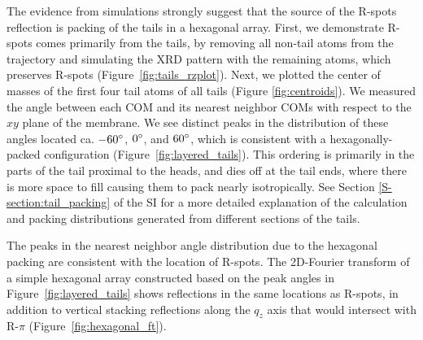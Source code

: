 \documentclass[journal=jpcbfk,manuscript=article]{achemso}
\begin{document}
  The evidence from simulations strongly suggest that the source of the R-spots
  reflection is packing of the tails in a hexagonal array.  First, we demonstrate
  R-spots comes primarily from the tails, by removing all non-tail atoms from the
  trajectory and simulating the XRD pattern with the remaining atoms, which
  preserves R-spots (Figure~\ref{fig:tails_rzplot}).  Next, we plotted the center
  of masses of the first four tail atoms of all tails (Figure
  \ref{fig:centroids}). We measured the angle between each COM and its nearest
  neighbor COMs with respect to the $xy$ plane of the membrane. We see distinct
  peaks in the distribution of these angles located ca. $-60\degree$, $0\degree$,
  and $60\degree$, which is consistent with a hexagonally-packed configuration
  (Figure~\ref{fig:layered_tails}).  This ordering is primarily in the parts of
  the tail proximal to the heads, and dies off at the tail ends, where there is
  more space to fill causing them to pack nearly isotropically. See Section
  \ref{S-section:tail_packing} of the SI for a more detailed explanation of the
  calculation and packing distributions generated from different sections of the
  tails.

  The peaks in the nearest neighbor angle distribution due to the hexagonal
  packing are consistent with the location of R-spots. The 2D-Fourier transform
  of a simple hexagonal array constructed based on the peak angles in
  Figure~\ref{fig:layered_tails} shows reflections in the same locations as
  R-spots, in addition to vertical stacking reflections along the $q_z$ axis that
  would intersect with R-$\pi$ (Figure~\ref{fig:hexagonal_ft}). 
\end{document}
